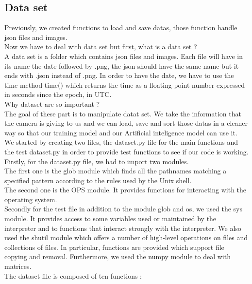 \documentclass[12pt]{article}
\begin{document}
\subsection{Data set}
Previously, we created functions to load and save datas, those function handle json files and images. \\
Now we have to deal with data set but first, what is a data set ? \\ 
A data set is a folder which contains json files and images. Each file will have in its name the date followed by .png, the json should have the same name but it ends with .json instead of .png. In order to have the date, we have to use the time method time() which returns the time as a floating point number expressed in seconds since the epoch, in UTC.\\

Why dataset are so important ? \\ 
The goal of these part is to manipulate datat set. We take the information that the camera is giving to us and we can load, save and sort those datas in a cleaner way so that our training model and our Artificial inteligence model can use it.\\

We started by creating two files, the dataset.py file for the main functions and the test dataset.py in order to provide test functions to see if our code is working.\\

Firstly, for the dataset.py file, we had to import  two modules. \\
The first one is the glob module which finds all the pathnames matching a specified pattern according to the rules used by the Unix shell.\\
The second one is the OPS module. It provides functions for interacting with the operating system.\\

Secondly for the test file in addition to the module glob and os, we used the sys module. It provides access to some variables used or maintained by the interpreter and to functions that interact strongly with the interpreter.
We also used the shutil module which offers a number of high-level operations on files and collections of files. In particular, functions are provided which support file copying and removal. Furthermore, we used the numpy module to deal with matrices.\\


The dataset file is composed of ten functions :\\ 
\end{document}
